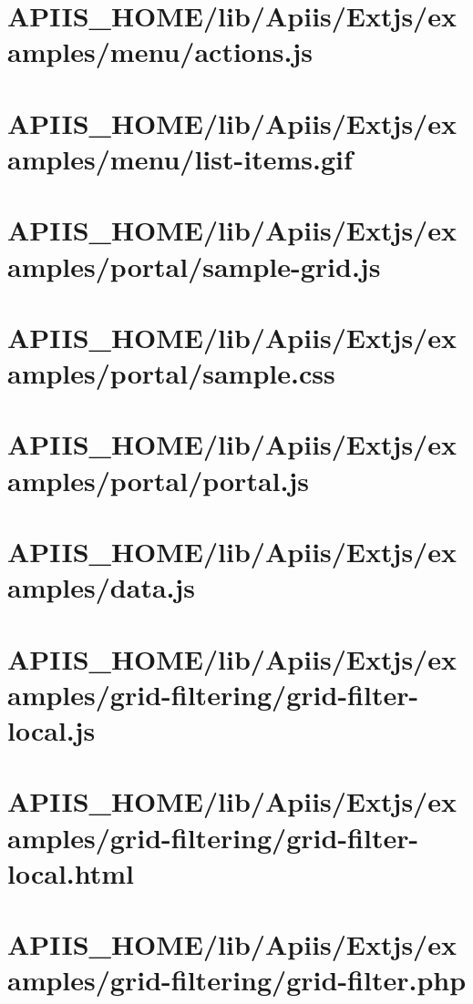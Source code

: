 \section{APIIS\_HOME/lib/Apiis/Extjs/examples/menu/actions.js} 
\section{APIIS\_HOME/lib/Apiis/Extjs/examples/menu/list-items.gif} 
\section{APIIS\_HOME/lib/Apiis/Extjs/examples/portal/sample-grid.js} 
\section{APIIS\_HOME/lib/Apiis/Extjs/examples/portal/sample.css} 
\section{APIIS\_HOME/lib/Apiis/Extjs/examples/portal/portal.js} 
\section{APIIS\_HOME/lib/Apiis/Extjs/examples/data.js} 
\section{APIIS\_HOME/lib/Apiis/Extjs/examples/grid-filtering/grid-filter-local.js} 
\section{APIIS\_HOME/lib/Apiis/Extjs/examples/grid-filtering/grid-filter-local.html} 
\section{APIIS\_HOME/lib/Apiis/Extjs/examples/grid-filtering/grid-filter.php} 
